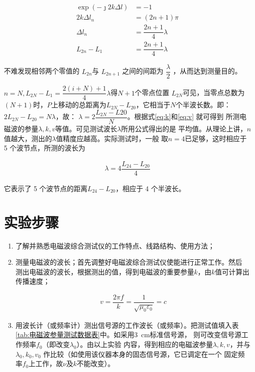 \documentclass[../main]{subfiles}
\begin{document}
\begin{align}
	\exp( - \jmath 2k\Delta l) & = - 1\\
	2k\Delta l_n & = (2n + 1)\pi\\
	\Delta l_n & = \dfrac{2n + 1}{4}\lambda \\
	\label{eq:lambda}
	L_{2n} - L_1 & = \dfrac{2n + 1}{4}\lambda
\end{align}

不难发现相邻两个零值的 $ L_{2n} $与 $ L_{2n + 1} $ 之间的间距为 $ \dfrac{\lambda
}{2} $ ，从而达到测量目的。

$ n = N, L_{2N} - L_1 = \dfrac{2(i + N) + 1}{4}\lambda $得$ N + 1 $个零点位置
$L_{2N} $可见，当零点总数为$ (N + 1) $时，$ P $上移动的总距离为$ L_{2N} - L_{20}
$，它相当于$ N $个半波长数。即：$ 2L_{2N} - L_{20} = N\lambda $，故：
$ \lambda = 2\dfrac{L_{2N} - L{20}}{N} $。根据式\ref{eq:k}和\ref{eq:v} 就可得到
所测电磁波的参量$ \lambda , k, v $等值。可见测试波长$ \lambda $所用公式得出的是
平均值。从理论上讲，$ n $值越大，测出的$ \lambda $值精度应越高。实际测试时，一般
取$ n = 4 $已足够，这时相应于 5 个波节点，所测的波长为

\begin{align}
	\lambda = 4\dfrac{L_{24} - L_{20}}{4}
\end{align}

它表示了 5 个波节点的距离$ L_{24} - L_{20} $，相应于 4 个半波长。

\section{实验步骤}%
\label{sec:\arabic{chapter}实验步骤}

\begin{enumerate}

	\item 了解并熟悉电磁波综合测试仪的工作特点、线路结构、使用方法；

	\item 测量电磁波的波长；首先调整好电磁波综合测试仪使能进行正常工作。然后
		测出电磁波的波长，根据测出的值，得到电磁波的重要参量$ k $，由$ k
		$值可计算出传播速度；

		\begin{align}
			v = \dfrac{2\pi f}{k} = \dfrac{1}{\sqrt{\mu_0\varepsilon_0}} = c
		\end{align}

	\item 用波长计（或频率计）测出信号源的工作波长（或频率）。把测试值填入表
		\ref{tab:电磁波参量测试数据表}中。如采用\SI{3}{\cm}标准信号源，
		则可改变信号源工作频率$ f_0 $（即改变$ \lambda_0 $）。由以上实验
		内容，得到相应的电磁波参量$ \lambda, k, v $，并与$ \lambda_0,
		k_0, v_0 $ 作比较（如使用该仪器本身的固态信号源，它已调定在一个
		固定频率$ f_0 $上工作，故$ ν $及$ k $不能改变）。

\end{enumerate}
\end{document}
